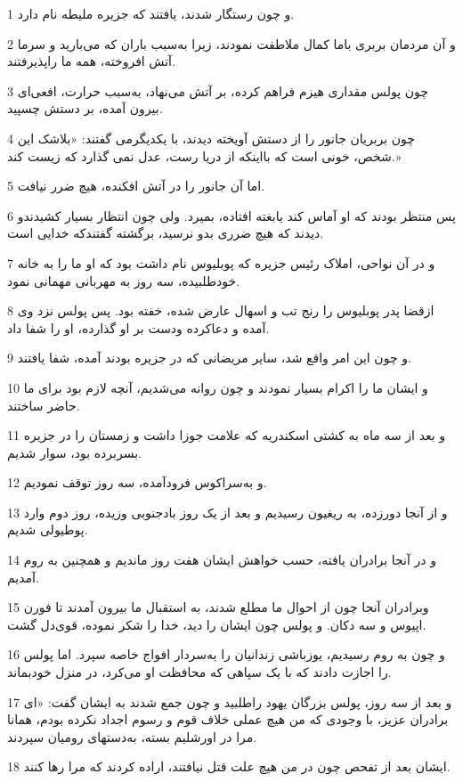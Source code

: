 \par 1 و چون رستگار شدند، یافتند که جزیره ملیطه نام دارد.
\par 2 و آن مردمان بربری باما کمال ملاطفت نمودند، زیرا به‌سبب باران که می‌بارید و سرما آتش افروخته، همه ما راپذیرفتند.
\par 3 چون پولس مقداری هیزم فراهم کرده، بر آتش می‌نهاد، به‌سبب حرارت، افعی‌ای بیرون آمده، بر دستش چسپید.
\par 4 چون بربریان جانور را از دستش آویخته دیدند، با یکدیگرمی گفتند: «بلاشک این شخص، خونی است که بااینکه از دریا رست، عدل نمی گذارد که زیست کند.»
\par 5 اما آن جانور را در آتش افکنده، هیچ ضرر نیافت.
\par 6 پس منتظر بودند که او آماس کند یابغته افتاده، بمیرد. ولی چون انتظار بسیار کشیدندو دیدند که هیچ ضرری بدو نرسید، برگشته گفتندکه خدایی است.
\par 7 و در آن نواحی، املاک رئیس جزیره که پوبلیوس نام داشت بود که او ما را به خانه خودطلبیده، سه روز به مهربانی مهمانی نمود.
\par 8 ازقضا پدر پوبلیوس را رنج تب و اسهال عارض شده، خفته بود. پس پولس نزد وی آمده و دعاکرده ودست بر او گذارده، او را شفا داد.
\par 9 و چون این امر واقع شد، سایر مریضانی که در جزیره بودند آمده، شفا یافتند.
\par 10 و ایشان ما را اکرام بسیار نمودند و چون روانه می‌شدیم، آنچه لازم بود برای ما حاضر ساختند.
\par 11 و بعد از سه ماه به کشتی اسکندریه که علامت جوزا داشت و زمستان را در جزیره بسربرده بود، سوار شدیم.
\par 12 و به‌سراکوس فرودآمده، سه روز توقف نمودیم.
\par 13 و از آنجا دورزده، به ریغیون رسیدیم و بعد از یک روز بادجنوبی وزیده، روز دوم وارد پوطیولی شدیم.
\par 14 و در آنجا برادران یافته، حسب خواهش ایشان هفت روز ماندیم و همچنین به روم آمدیم.
\par 15 وبرادران آنجا چون از احوال ما مطلع شدند، به استقبال ما بیرون آمدند تا فورن اپیوس و سه دکان. و پولس چون ایشان را دید، خدا را شکر نموده، قوی‌دل گشت.
\par 16 و چون به روم رسیدیم، یوزباشی زندانیان را به‌سردار افواج خاصه سپرد. اما پولس را اجازت دادند که با یک سپاهی که محافظت او می‌کرد، در منزل خودبماند.
\par 17 و بعد از سه روز، پولس بزرگان یهود راطلبید و چون جمع شدند به ایشان گفت: «ای برادران عزیز، با وجودی که من هیچ عملی خلاف قوم و رسوم اجداد نکرده بودم، همانا مرا در اورشلیم بسته، به‌دستهای رومیان سپردند.
\par 18 ایشان بعد از تفحص چون در من هیچ علت قتل نیافتند، اراده کردند که مرا رها کنند.
